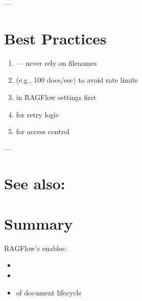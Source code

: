\documentclass[letterpaper,10pt,english]{sphinxmanual}
\begin{document}
\sphinxAtStartPar
—


\section{Best Practices}
\label{\detokenize{api:best-practices}}\begin{enumerate}
%
\item {} 
\sphinxAtStartPar
{} — never rely on filenames

\item {} 
\sphinxAtStartPar
{} (e.g., 100 docs/sec) to avoid rate limits

\item {} 
\sphinxAtStartPar
{} in RAGFlow settings first

\item {} 
\sphinxAtStartPar
{} for retry logic

\item {} 
\sphinxAtStartPar
{} for access control

\end{enumerate}

\sphinxAtStartPar
—


\section{See also:}
\label{\detokenize{api:see-also}}
\sphinxAtStartPar
{}


\section{Summary}
\label{\detokenize{api:summary}}
\sphinxAtStartPar
RAGFlow’s  enables:
\begin{itemize}
\item {} 
\sphinxAtStartPar
{}

\item {} 
\sphinxAtStartPar
{}

\item {} 
\sphinxAtStartPar
{} of document lifecycle

\end{itemize}
\end{document}
